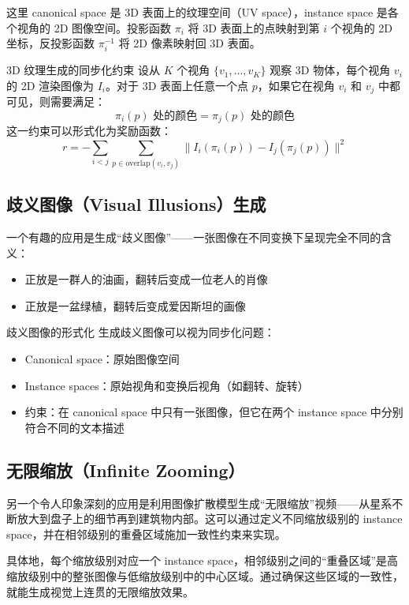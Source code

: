 \documentclass[a4paper]{article}
\begin{document}
这里 canonical space 是 3D 表面上的纹理空间（UV space），instance space 是各个视角的 2D 图像空间。投影函数 $\pi_i$ 将 3D 表面上的点映射到第 $i$ 个视角的 2D 坐标，反投影函数 $\pi_i^{-1}$ 将 2D 像素映射回 3D 表面。

\begin{importantbox}{3D 纹理生成的同步化约束}
设从 $K$ 个视角 $\{v_1, \ldots, v_K\}$ 观察 3D 物体，每个视角 $v_i$ 的 2D 渲染图像为 $I_i$。对于 3D 表面上任意一个点 $p$，如果它在视角 $v_i$ 和 $v_j$ 中都可见，则需要满足：
$$\pi_i(p) \text{ 处的颜色} = \pi_j(p) \text{ 处的颜色}$$
这一约束可以形式化为奖励函数：
$$r = -\sum_{i < j} \sum_{p \in \text{overlap}(v_i, v_j)} \| I_i(\pi_i(p)) - I_j(\pi_j(p)) \|^2$$
\end{importantbox}

\subsection{歧义图像（Visual Illusions）生成}

一个有趣的应用是生成``歧义图像''——一张图像在不同变换下呈现完全不同的含义：
\begin{itemize}
    \item 正放是一群人的油画，翻转后变成一位老人的肖像
    \item 正放是一盆绿植，翻转后变成爱因斯坦的画像
\end{itemize}

\begin{knowledgebox}{歧义图像的形式化}
生成歧义图像可以视为同步化问题：
\begin{itemize}
    \item Canonical space：原始图像空间
    \item Instance spaces：原始视角和变换后视角（如翻转、旋转）
    \item 约束：在 canonical space 中只有一张图像，但它在两个 instance space 中分别符合不同的文本描述
\end{itemize}
\end{knowledgebox}

\subsection{无限缩放（Infinite Zooming）}

另一个令人印象深刻的应用是利用图像扩散模型生成``无限缩放''视频——从星系不断放大到盘子上的细节再到建筑物内部。这可以通过定义不同缩放级别的 instance space，并在相邻级别的重叠区域施加一致性约束来实现。

具体地，每个缩放级别对应一个 instance space，相邻级别之间的``重叠区域''是高缩放级别中的整张图像与低缩放级别中的中心区域。通过确保这些区域的一致性，就能生成视觉上连贯的无限缩放效果。
\end{document}
